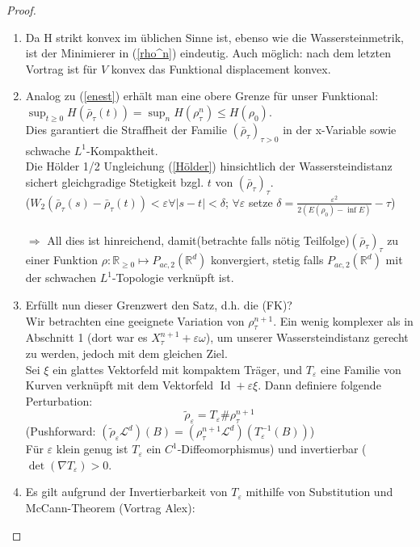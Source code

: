 \documentclass[11pt,a4paper,notitlepage]{scrreprt}
\newcommand{\RR}{\mathbb{R}}
\begin{document}
\begin{proof}
\begin{enumerate}
\item Da H strikt konvex im üblichen Sinne ist, ebenso wie die Wassersteinmetrik, ist der Minimierer in (\ref{rho^n})  eindeutig. Auch möglich: nach dem letzten Vortrag ist für $V$ konvex das Funktional displacement konvex. 
\item Analog zu (\ref{enest}) erhält man eine obere Grenze für unser Funktional: ${\sup_{t\geq 0} H(\bar{\rho}_\tau(t))=\sup_n H(\rho_\tau^n)\leq H(\rho_0)}$.\\
Dies garantiert die Straffheit der Familie $(\bar{\rho}_\tau)_{\tau >0}$ in der x-Variable sowie schwache $L^1$-Kompaktheit.\\
Die Hölder 1/2 Ungleichung (\ref{Hölder}) hinsichtlich der Wassersteindistanz sichert gleichgradige Stetigkeit bzgl. $t$ von $(\bar{\rho}_\tau)_\tau$.\\ ($W_2(\bar{\rho}_\tau(s)-\bar{\rho}_\tau(t))<\varepsilon \forall \vert s-t\vert<\delta$; $\forall \varepsilon$ setze $\delta=\frac{\varepsilon^2}{2(E(\rho_0)-\inf E)}-\tau$)\\\\
$\Rightarrow$ All dies ist hinreichend, damit(betrachte falls nötig Teilfolge)$(\bar{\rho}_\tau)_\tau$ zu einer Funktion $\rho: \RR_{\geq0} \mapsto P_{ac,2}(\RR^d)$ konvergiert, stetig falls $P_{ac,2}(\RR^d)$ mit der schwachen $L^1$-Topologie verknüpft ist. \\
\item Erfüllt nun dieser Grenzwert den Satz, d.h. die (FK)? \\
Wir betrachten eine geeignete Variation von $\rho_\tau^{n+1}$. Ein wenig komplexer als in Abschnitt 1 (dort war es $X_\tau^{n+1}+\varepsilon\omega$), um unserer Wassersteindistanz gerecht zu werden, jedoch mit dem gleichen Ziel.\\
Sei $\xi$ ein glattes Vektorfeld mit kompaktem Träger, und $T_\varepsilon$ eine Familie von Kurven verknüpft mit dem Vektorfeld $\operatorname{Id} +\varepsilon\xi$. Dann definiere folgende Perturbation:
\[\tilde{\rho}_\varepsilon=T_\varepsilon \#\rho_\tau^{n+1} \]
(Pushforward: $(\tilde{\rho}_\varepsilon \mathcal{L}^d)(B)=(\rho_\tau^{n+1}\mathcal{L}^d)(T_\varepsilon^{-1}(B))$)\\
Für $\varepsilon$ klein genug ist $T_\varepsilon$ ein $C^1$-Diffeomorphismus) und invertierbar ($\det(\nabla T_\varepsilon)>0$.\\
\item Es gilt aufgrund der Invertierbarkeit von $T_\varepsilon$ mithilfe von Substitution und McCann-Theorem (Vortrag Alex):  

\end{enumerate}
\end{proof}
\end{document}
